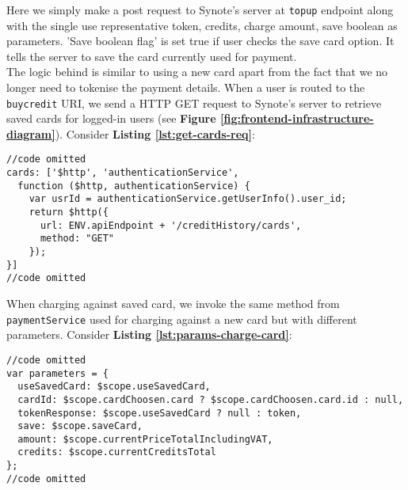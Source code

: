 Here we simply make a post request to Synote’s server at \texttt{topup} endpoint along with the single use representative token, credits, charge amount, save boolean as parameters. 'Save boolean flag' is set true if user checks the save card option. It tells the server to save the card currently used for payment.\\

The logic behind is similar to using a new card apart from the fact that we no longer need to tokenise the payment details. When a user is routed to the \texttt{buycredit} URI, we send a HTTP GET request to Synote’s server to retrieve saved cards for logged-in users (see \textbf{Figure \ref{fig:frontend-infrastructure-diagram}}). Consider \textbf{Listing \ref{lst:get-cards-req}}:\\

\begin{listing}[H]
\begin{verbatim}
//code omitted
cards: ['$http', 'authenticationService',
  function ($http, authenticationService) {
    var usrId = authenticationService.getUserInfo().user_id;
    return $http({
      url: ENV.apiEndpoint + '/creditHistory/cards',
      method: "GET"
    });
}]
//code omitted
\end{verbatim}
\label{lst:get-cards-req}
\end{listing}

When charging against saved card, we invoke the same method from \texttt{paymentService} used for charging against a new card but with different parameters. Consider \textbf{Listing \ref{lst:params-charge-card}}:\\

\begin{listing}[H]
\begin{verbatim}
//code omitted
var parameters = {
  useSavedCard: $scope.useSavedCard,
  cardId: $scope.cardChoosen.card ? $scope.cardChoosen.card.id : null,
  tokenResponse: $scope.useSavedCard ? null : token,
  save: $scope.saveCard,
  amount: $scope.currentPriceTotalIncludingVAT,
  credits: $scope.currentCreditsTotal
};
//code omitted
\end{verbatim}
\label{lst:params-charge-card}
\end{listing}

